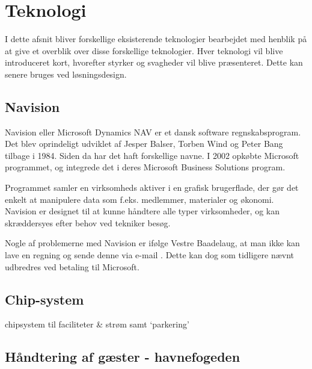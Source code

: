 \section{Teknologi} %
\label{sec:Teknologi}

I dette afsnit bliver forskellige eksisterende teknologier bearbejdet med henblik på at give et overblik over disse forskellige teknologier. Hver teknologi vil blive introduceret kort, hvorefter styrker og svagheder vil blive præsenteret. Dette kan senere bruges ved løsningsdesign.


\subsection{Navision} %
\label{sub:Navision}

Navision eller Microsoft Dynamics NAV er et dansk software regnskabsprogram. Det blev oprindeligt udviklet af Jesper Balser, Torben Wind og Peter Bang tilbage i 1984. Siden da har det haft forskellige navne. I 2002 opkøbte Microsoft programmet, og integrede det i deres Microsoft Business Solutions program.

Programmet samler en virksomheds aktiver i en grafisk brugerflade, der gør det enkelt at manipulere data som f.eks. medlemmer, materialer og økonomi. Navision er designet til at kunne håndtere alle typer virksomheder, og kan skræddersyes efter behov ved tekniker besøg.


Nogle af problemerne med Navision er ifølge Vestre Baadelaug, at man ikke kan lave en regning og sende denne via e-mail \cite{int_vb_sl}. Dette kan dog som tidligere nævnt udbredres ved betaling til Microsoft.


\subsection{Chip-system} %
\label{sub:Chip}


chipsystem til faciliteter \& strøm samt `parkering'

\subsection{Håndtering af gæster - havnefogeden} %
\label{sub:havnefogeden}


